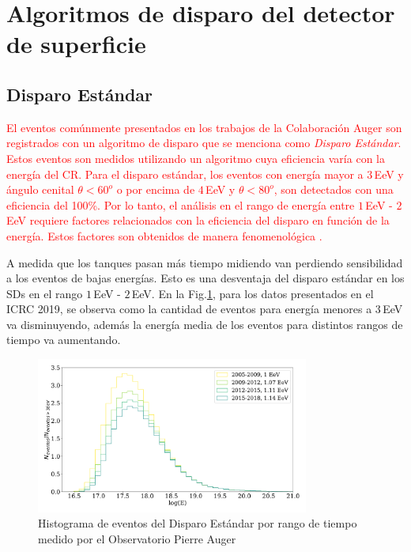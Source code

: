 

\section{Algoritmos de disparo del detector de superficie} \label{triggers_caracteristicas}

\subsection{Disparo Estándar}

\textcolor{red}{El eventos comúnmente presentados en los trabajos de la Colaboración Auger son registrados con un algoritmo de disparo que se menciona como \emph{Disparo Estándar}.  Estos eventos son  medidos utilizando un algoritmo cuya eficiencia varía con la energía del CR. Para el disparo estándar, los eventos con energía mayor a $3\,$EeV y ángulo cenital $\theta<60^o$ o  por encima de $4\,$EeV y $\theta<80^o$, son detectados con una eficiencia del 100\%. Por lo tanto, el análisis en el rango de energía entre $1\,$EeV - $2\,$EeV requiere factores relacionados con la eficiencia del disparo en función de la energía. Estos factores son obtenidos de manera fenomenológica \cite{taborda}.}%


A medida que los tanques pasan más tiempo midiendo van perdiendo sensibilidad a los eventos de bajas energías. Esto es una desventaja del disparo estándar en los SDs en el rango $1\,$EeV - $2\,$EeV.  En la Fig.\ref{fig:futuro}, para los datos presentados en el ICRC 2019, se observa como la cantidad de eventos para energía menores a $3\,$EeV va disminuyendo, además la energía media de los eventos para distintos rangos de tiempo va aumentando.%

\begin{figure}[H]
	\centering
	\includegraphics[width=0.8\textwidth]{histograma_Standard.pdf}
	\caption{Histograma de eventos  del Disparo Estándar por rango de tiempo medido por el Observatorio Pierre Auger}
	\label{fig:futuro}
\end{figure}



